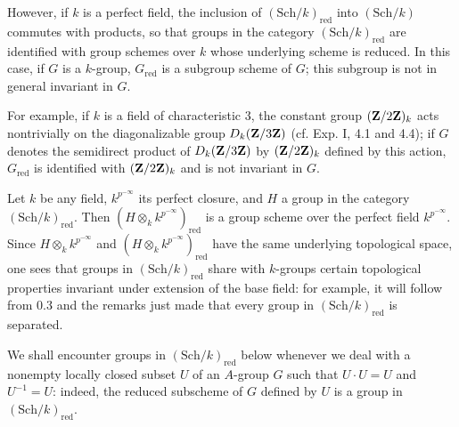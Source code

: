 However, if $k$ is a perfect field, the inclusion of $(\mathrm{Sch}/k)_{\mathrm{red}}$ into $(\mathrm{Sch}/k)$ commutes with products, so that groups in the category $(\mathrm{Sch}/k)_{\mathrm{red}}$ are identified with group schemes over $k$ whose underlying scheme is reduced. In this case, if $G$ is a $k$-group, $G_{\mathrm{red}}$ is a subgroup scheme of $G$; this subgroup is not in general invariant in $G$.

For example, if $k$ is a field of characteristic 3, the constant group $(\mathbf{Z}/2\mathbf{Z})_k$ acts nontrivially on the diagonalizable group $D_k(\mathbf{Z}/3\mathbf{Z})$ (cf. Exp. I, 4.1 and 4.4); if $G$ denotes the semidirect product of $D_k(\mathbf{Z}/3\mathbf{Z})$ by $(\mathbf{Z}/2\mathbf{Z})_k$ defined by this action, $G_{\mathrm{red}}$ is identified with $(\mathbf{Z}/2\mathbf{Z})_k$ and is not invariant in $G$.

Let $k$ be any field, $k^{p^{-\infty}}$ its perfect closure, and $H$ a group in the category $(\mathrm{Sch}/k)_{\mathrm{red}}$. Then $(H\otimes_kk^{p^{-\infty}})_{\mathrm{red}}$ is a group scheme over the perfect field $k^{p^{-\infty}}$. Since $H\otimes_kk^{p^{-\infty}}$ and $(H\otimes_kk^{p^{-\infty}})_{\mathrm{red}}$ have the same underlying topological space, one sees that groups in $(\mathrm{Sch}/k)_{\mathrm{red}}$ share with $k$-groups certain topological properties invariant under extension of the base field: for example, it will follow from 0.3 and the remarks just made that every group in $(\mathrm{Sch}/k)_{\mathrm{red}}$ is separated.

We shall encounter groups in $(\mathrm{Sch}/k)_{\mathrm{red}}$ below whenever we deal with a nonempty locally closed subset $U$ of an $A$-group $G$ such that $U\cdot U=U$ and $U^{-1}=U$: indeed, the reduced subscheme of $G$ defined by $U$ is a group in $(\mathrm{Sch}/k)_{\mathrm{red}}$.

